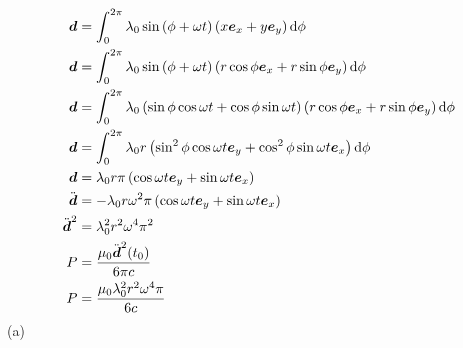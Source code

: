 \begin{align*}
    \boldsymbol{d}&=\int_{0}^{2\pi}\lambda_0\sin\left(\phi+\omega t\right) \left(x\boldsymbol{e}_x+y\boldsymbol{e}_y\right)\dif\phi\\
    \boldsymbol{d}&=\int_{0}^{2\pi}\lambda_0\sin\left(\phi+\omega t\right)\left(r\cos\phi\boldsymbol{e}_x+r\sin\phi\boldsymbol{e}_y\right)\dif\phi\\
    \boldsymbol{d}&=\int_{0}^{2\pi}\lambda_0\left(\sin\phi\cos\omega t+\cos\phi\sin\omega t\right)\left(r\cos\phi\boldsymbol{e}_x+r\sin\phi\boldsymbol{e}_y\right)\dif\phi\\
    \boldsymbol{d}&=\int_{0}^{2\pi}\lambda_0r\left(\sin^2\phi\cos\omega t\boldsymbol{e}_y+\cos^2\phi\sin\omega t\boldsymbol{e}_x\right)\dif\phi\\
    \boldsymbol{d}&=\lambda_0r\pi\left(\cos\omega t\boldsymbol{e}_y+\sin\omega t\boldsymbol{e}_x\right)\\
    \ddot{\boldsymbol{d}}&=-\lambda_0r\omega^2\pi\left(\cos\omega t\boldsymbol{e}_y+\sin\omega t\boldsymbol{e}_x\right)\\
    \ddot{\boldsymbol{d}}^2&=\lambda_0^2r^2\omega^4\pi^2\\
    P&=\frac{\mu_0\ddot{\boldsymbol{d}}^2(t_0)}{6\pi c}\\
    P&=\frac{\mu_0\lambda_0^2r^2\omega^4\pi}{6c}
\end{align*}
(a)
